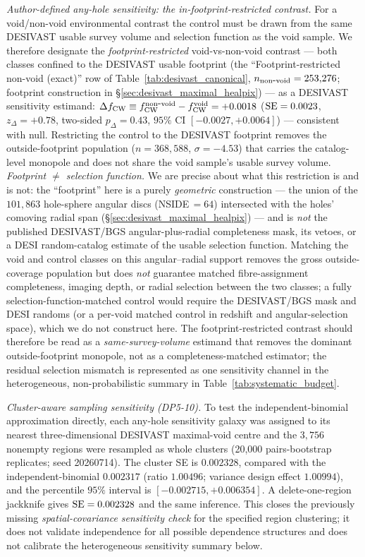 \documentclass[aps,prd,twocolumn,superscriptaddress,showpacs,preprintnumbers,nofootinbib,longbibliography,floatfix]{revtex4-2}
\begin{document}
\emph{Author-defined any-hole sensitivity: the in-footprint-restricted contrast.} For a
void/non-void environmental contrast the control must be drawn from the
same DESIVAST usable survey volume and selection function as the void
sample. We therefore designate the \emph{footprint-restricted}
void-vs-non-void contrast --- both classes confined to the DESIVAST
usable footprint (the ``Footprint-restricted non-void (exact)'' row of
Table~\ref{tab:desivast_canonical}, $n_{\rm non\mbox{-}void} =
253{,}276$; footprint construction in \S\ref{sec:desivast_maximal_healpix})
--- as a DESIVAST sensitivity estimand:
$\Delta f_{\rm CW} \equiv f_{\rm CW}^{\rm non\mbox{-}void}
- f_{\rm CW}^{\rm void} = +0.0018$ (${\rm SE} = 0.0023$,
$z_\Delta = +0.78$, two-sided $p_\Delta = 0.43$, $95\%$ CI
$[-0.0027, +0.0064]$) --- consistent with null. Restricting the control
to the DESIVAST footprint removes the outside-footprint population
($n = 368{,}588$, $\sigma = -4.53$) that carries the catalog-level
monopole and does not share the void sample's usable survey volume.
\emph{Footprint $\neq$ selection function.} We are precise about what
this restriction is and is not: the ``footprint'' here is a purely
\emph{geometric} construction --- the union of the $101{,}863$
hole-sphere angular discs (NSIDE\,$=\!64$) intersected with the holes'
comoving radial span (\S\ref{sec:desivast_maximal_healpix}) --- and is
\emph{not} the published DESIVAST/BGS angular-plus-radial completeness
mask, its vetoes, or a DESI random-catalog estimate of the usable
selection function. Matching the void and control classes on this
angular--radial support removes the gross outside-coverage population but
does \emph{not} guarantee matched fibre-assignment completeness, imaging
depth, or radial selection between the two classes; a fully
selection-function-matched control would require the DESIVAST/BGS mask and
DESI randoms (or a per-void matched control in redshift and
angular-selection space), which we do not construct here. The
footprint-restricted contrast should therefore be read as a
\emph{same-survey-volume} estimand that removes the dominant
outside-footprint monopole, not as a completeness-matched estimator;
the residual selection mismatch is represented as one sensitivity channel
in the heterogeneous, non-probabilistic summary in
Table~\ref{tab:systematic_budget}.

\emph{Cluster-aware sampling sensitivity (DP5-10).} To test the
independent-binomial approximation directly, each any-hole sensitivity galaxy
was assigned to its nearest three-dimensional DESIVAST maximal-void
centre and the $3{,}756$ nonempty regions were resampled as whole
clusters (20,000 pairs-bootstrap replicates; seed 20260714). The cluster
SE is $0.002328$, compared with the independent-binomial $0.002317$
(ratio $1.00496$; variance design effect $1.00994$), and the percentile
$95\%$ interval is $[-0.002715,+0.006354]$. A delete-one-region
jackknife gives ${\rm SE}=0.002328$ and the same inference. This closes
the previously missing \emph{spatial-covariance sensitivity check} for
the specified region clustering; it does not validate independence for
all possible dependence structures and does not calibrate the
heterogeneous sensitivity summary below.
\end{document}
